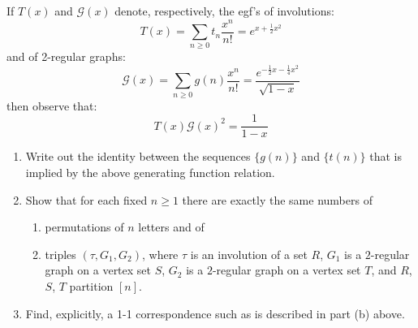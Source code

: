 \begin{exercise}
    If $T(x)$ and $\mathcal{G}(x)$ denote, respectively, the egf's of involutions:
    \[
        T(x) = \sum_{n\geq 0}t_n\frac{x^n}{n!} = e^{x+\frac{1}{2}x^2}
    \]
    and of 2-regular graphs:
    \[
        \mathcal{G}(x) = \sum_{n\geq0}g(n) \frac{x^n}{n!}  = \frac{e^{-\frac{1}{2}x-\frac{1}{4}x^2}}{\sqrt{1-x}}
    \]
    then observe that:
    \[
        T(x)\mathcal{G}(x)^2 = \frac{1}{1-x}
    \]
    \begin{enumerate}[label=(\alph*)]
        \item Write out the identity between the sequences $\{g(n)\}$ and $\{t(n)\}$ that is implied by the above generating function relation.
        \item Show that for each fixed $n\geq1$ there are exactly the same numbers of
        \begin{enumerate}[label=(\roman*)]
            \item permutations of $n$ letters and of
            \item triples $(\tau,G_1,G_2)$, where $\tau$ is an involution of a set $R$, $G_1$ is a $2$-regular graph on a vertex set $S$, $G_2$ is a $2$-regular graph on a vertex set $T$, and $R$, $S$, $T$ partition $[n]$.
        \end{enumerate}
        \item Find, explicitly, a 1-1 correspondence such as is described in part (b) above.
    \end{enumerate}
\end{exercise}
